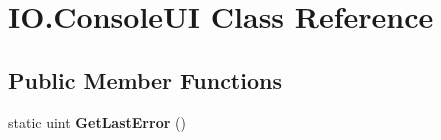 \hypertarget{class_i_o_1_1_console_u_i}{}\section{I\+O.\+Console\+UI Class Reference}
\label{class_i_o_1_1_console_u_i}
\subsection*{Public Member Functions}
\begin{DoxyCompactItemize}
\item 
\mbox{\label{class_i_o_1_1_console_u_i_a0c7f62392769a5d8f3eb557a69dfaa4e}} 
static uint {\bfseries Get\+Last\+Error} ()
\end{DoxyCompactItemize}
